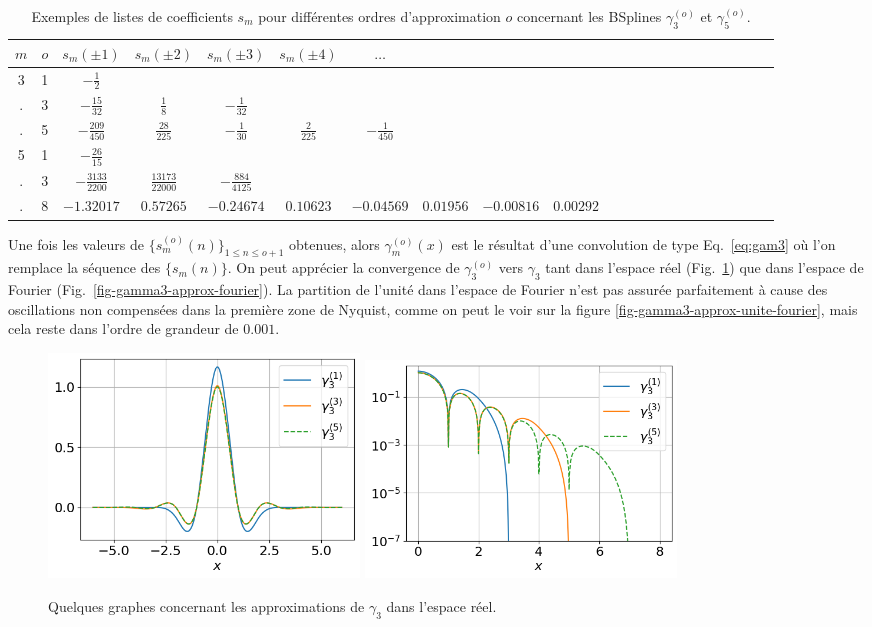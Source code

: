 \documentclass[11pt,twoside]{article}
\begin{document}
\begin{table}
\small
\centering
\begin{tabular}{cc|*{20}{c}}
\toprule
 $m$ & $o$ & $s_m(\pm 1)$ & $s_m(\pm 2)$ & $s_m(\pm 3)$ & $s_m(\pm 4)$ & $\ldots$& \\ \midrule
   3 & 1   & $-\frac{1}{2}$ &       & \\
   . & 3   &  $-\frac{15}{32}$&$\frac{1}{8}$&$-\frac{1}{32}$&   \\
   . & 5   &  $-\frac{209}{450}$& $\frac{28}{225}$ & $-\frac{1}{30}$  & $\frac{2}{225}$&$-\frac{1}{450}$& \\ \midrule
   5 & 1   & $-\frac{26}{15}$& \\
   . & 3   & $-\frac{3133}{2200}$&$\frac{13173}{22000}$&$-\frac{884}{4125}$ & \\
   . & 8   & $-1.32017$ & $0.57265$& $-0.24674$& $0.10623$& $-0.04569$& $0.01956$& 
$-0.00816$& $0.00292$ \\
\bottomrule
\end{tabular}
\caption{Exemples de listes de coefficients $s_m$ pour différentes ordres d'approximation $o$ concernant les BSplines $\gamma^{(o)}_3$ et $\gamma^{(o)}_5$.} 
\label{tab-scoeff-bsplinecardapprox}
\end{table}
Une fois les valeurs de $\{s^{(o)}_m(n)\}_{1\leq n\leq o+1}$ obtenues, alors $\gamma_m^{(o)}(x)$ est le résultat d'une convolution de type Eq.~\ref{eq:gam3} où l'on remplace la séquence des $\{s_m(n)\}$. On peut apprécier la convergence de $\gamma^{(o)}_3$ vers $\gamma_3$ tant dans l'espace réel (Fig.~\ref{fig-gamma3-approx-real}) que dans l'espace de Fourier (Fig.~\ref{fig-gamma3-approx-fourier}). La partition de l'unité dans l'espace de Fourier n'est pas assurée parfaitement à cause des oscillations non compensées dans la première zone de Nyquist, comme on peut le voir sur la figure  \ref{fig-gamma3-approx-unite-fourier}, mais cela reste dans l'ordre de grandeur de $0.001$.
\begin{figure}
\centering
\includegraphics[width=0.4\textwidth]{fig13a.png}
\includegraphics[width=0.4\textwidth]{fig13b.png}
\caption{Quelques graphes concernant les approximations de $\gamma_3$ dans l'espace réel.}
\label{fig-gamma3-approx-real}
\end{figure}
\end{document}

